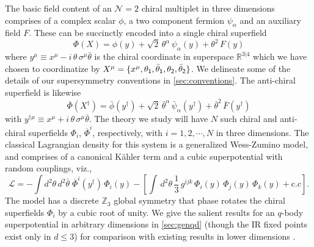\documentclass[11pt]{article}
\newcommand{\thetab}{\bar{\theta}}
\newcommand{\psib}{\bar{\psi}}
\newcommand{\Phib}{\overline{\Phi}}
\newcommand{\phib}{\bar{\phi}}
\newcommand{\Fb}{\bar{F}}
\begin{document}
The basic field content of an $\mathcal{N}=2$ chiral multiplet in three dimensions comprises of a complex scalar $\phi$, a two component fermion $\psi_\alpha$ and an auxiliary field $F$. These can be succinctly encoded into a single chiral superfield 
%
\begin{equation}\label{eq:chiral}
\Phi(X)  = \phi(y) + \sqrt{2}\, \theta^\alpha \,\psi_\alpha(y) + \theta^2\, F(y)
\end{equation}	
%
where $y^\mu \equiv x^\mu - i\, \theta\, \sigma^\mu \thetab$ is the chiral coordinate in superspace $\mathbb{R}^{3|4}$ which we have chosen to coordinatize by $X^\mu =\{x^\mu, \theta_{\sf 1}, \thetab_{\sf 1}, \theta_{\sf 2}, \thetab_{\sf 2}\}$. We delineate some of the details of our supersymmetry conventions in \cref{sec:conventions}.  The anti-chiral superfield is likewise
%
\begin{equation}\label{eq:achiral}
\Phib(X^\dagger)  = \phib(y^\dagger) + \sqrt{2}\, \thetab^\alpha \,\psib_\alpha(y^\dagger) + \thetab^2\, \Fb(y^\dagger)
\end{equation}	
%
with $y^{\dagger \mu}  \equiv x^\mu + i\, \theta\, \sigma^\mu \thetab$.  
The theory we  study will have $N$ such chiral and anti-chiral superfields $\Phi_i$, $\Phib^i$, respectively, with $i =1,2,\cdots, N$ in three dimensions. The classical Lagrangian density for this system is a generalized Wess-Zumino model, and comprises of a canonical K\"ahler term and a cubic superpotential with random couplings, viz.,
%
\begin{equation}\label{eq:syk3dLs}
\mathcal{L} = -\int d^2 \theta \, d^2\thetab\; \Phib^i(y^\dagger)\, \Phi_i(y) - \left[ \int\, d^2\theta\, \frac{1}{3}\, g^{ijk}\, \Phi_i(y) \,\Phi_j(y)\, \Phi_k(y)  + \text{c.c} \right] .
\end{equation}	
%
The model has a discrete $\mathbb{Z}_3$ global symmetry that phase rotates the chiral superfields $\Phi_i$ by a cubic root of unity.  We give the salient results for an  $q$-body superpotential in arbitrary dimensions in  \cref{sec:genqd}  (though the IR fixed points exist only in $d\leq 3$) for comparison with existing results in lower dimensions \cite{Anninos:2016szt,Murugan:2017eto}. 
\end{document}

